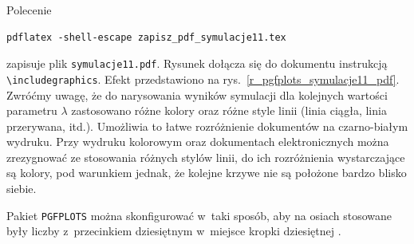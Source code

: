 Polecenie
\begin{lstlisting}[style=customlatex,frame=single]
pdflatex -shell-escape zapisz_pdf_symulacje11.tex
\end{lstlisting}
zapisuje plik \verb+symulacje11.pdf+. Rysunek dołącza się do dokumentu instrukcją \verb+\includegraphics+. Efekt przedstawiono na rys.~\ref{r_pgfplots_symulacje11_pdf}. Zwróćmy uwagę, że do narysowania wyników symulacji dla kolejnych wartości parametru $\lambda$ zastosowano różne kolory oraz różne style linii (linia ciągła, linia przerywana, itd.). Umożliwia to łatwe rozróżnienie dokumentów na czarno-białym wydruku. Przy wydruku kolorowym oraz dokumentach elektronicznych można zrezygnować ze stosowania różnych stylów linii, do ich rozróżnienia wystarczające są kolory, pod warunkiem jednak, że kolejne krzywe nie są położone bardzo blisko siebie.

Pakiet \verb+PGFPLOTS+ można skonfigurować w~taki sposób, aby na osiach stosowane były liczby z~przecinkiem dziesiętnym w~miejsce kropki dziesiętnej \cite{litFeuersanger2016}.

